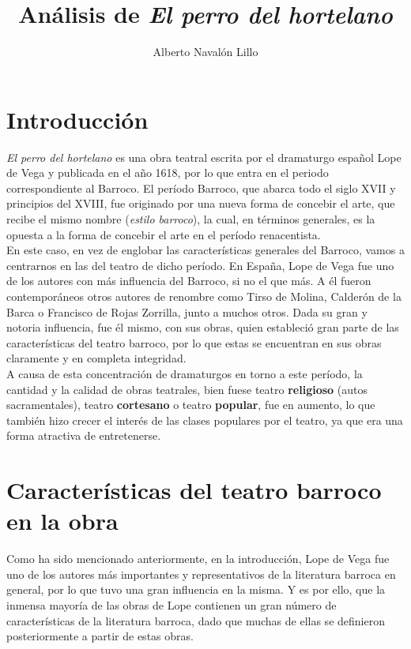 \documentclass[12pt,a4paper]{article}
\title{\textbf{Análisis de \textit{El perro del hortelano}}}
\author{Alberto Navalón Lillo}
\begin{document}
\maketitle
\tableofcontents

\section{Introducción}

\textit{El perro del hortelano} es una obra teatral escrita por el dramaturgo español Lope de Vega y publicada en el año 1618, por lo que entra en el periodo correspondiente al Barroco. El período Barroco, que abarca todo el siglo XVII y principios del XVIII, fue originado por una nueva forma de concebir el arte, que recibe el mismo nombre (\textit{estilo barroco}), la cual, en términos generales, es la opuesta a la forma de concebir el arte en el período renacentista.\\

En este caso, en vez de englobar las características generales del Barroco, vamos a centrarnos en las del teatro de dicho período. En España, Lope de Vega fue uno de los autores con más influencia del Barroco, si no el que más. A él fueron contemporáneos otros autores de renombre como Tirso de Molina, Calderón de la Barca o Francisco de Rojas Zorrilla, junto a muchos otros. Dada su gran y notoria influencia, fue él mismo, con sus obras, quien estableció gran parte de las características del teatro barroco, por lo que estas se encuentran en sus obras claramente y en completa integridad.\\

A causa de esta concentración de dramaturgos en torno a este período, la cantidad y la calidad de obras teatrales, bien fuese teatro \textbf{religioso} (autos sacramentales), teatro \textbf{cortesano} o teatro \textbf{popular}, fue en aumento, lo que también hizo crecer el interés de las clases populares por el teatro, ya que era una forma atractiva de entretenerse.

\section{Características del teatro barroco en la obra}

Como ha sido mencionado anteriormente, en la introducción, Lope de Vega fue uno de los autores más importantes y representativos de la literatura barroca en general, por lo que tuvo una gran influencia en la misma. Y es por ello, que la inmensa mayoría de las obras de Lope contienen un gran número de características de la literatura barroca, dado que muchas de ellas se definieron posteriormente a partir de estas obras.
\end{document}
